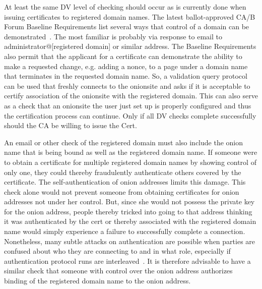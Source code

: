 \documentclass[10pt, conference, compsocconf]{styles/IEEEtran}
\begin{document}
At least the same DV level of checking should occur as is currently
done when issuing certificates to registered domain names. The latest
ballot-approved CA/B Forum Baseline Requirements list several ways
that control of a domain can be demonstrated~\cite{cabforum-br}.  The
most familiar is probably via response to email to
administrator@[registered domain] or similar address.
The Baseline Requirements also permit
that the applicant for a certificate can demonstrate the ability
to make a requested change, e.g. adding a nonce, to a
page under a domain name that terminates in the requested domain name. 
So, a  validation query protocol can be used
that freshly connects to the onionsite and asks if it is acceptable to
certify association of the onionsite with the registered domain.  This
can also serve as a check that an onionsite the user just set up is
properly configured and thus the certification process can continue.
Only if all DV checks complete successfully should the CA be willing
to issue the Cert.


An email or other check of the registered domain must also include the
onion name that is being bound as well as the registered domain name.
If someone were to obtain a certificate for multiple registered domain
names by showing control of only one, they could thereby fraudulently
authenticate others covered by the certificate. The
self-authentication of onion addresses limits this damage.  This check
alone would not prevent someone from obtaining certificates for onion
addresses not under her control. But, since she would not possess the
private key for the onion address, people thereby tricked into going
to that address thinking it was authenticated by the cert or thereby
associated with the registered domain name would simply experience a
failure to successfully complete a connection. Nonetheless, many
subtle attacks on authentication are possible when parties are
confused about who they are connecting to and in what role, especially
if authentication protocol runs are interleaved~\cite{fosad00}.  It is
therefore advisable to have a similar check that someone with control
over the onion address authorizes binding of the registered domain
name to the onion address.
\end{document}
